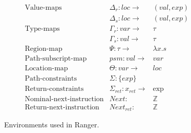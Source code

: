 \begin{figure}
$$
\begin{array}{lllll}
\text{Value-maps} & \Delta_r: loc \rightarrow & ( val, exp) &&
\\
& \Delta_s: loc \rightarrow & (val, exp) &&
\\
\text{Type-maps}  & \Gamma_r: var \rightarrow & \tau & &
\\
& \Gamma_s: val \rightarrow & \tau&&
\\
\text{Region-map} & \Psi: \tau \rightarrow & \lambda x.s &&
\\
\text{Path-subscript-map} & psm: val \rightarrow & var &&
\\
\text{Location-map} & \Theta: var \rightarrow & loc &&
\\
\text{Path-constraints} & \Sigma: \{exp\} &  &  & 
\\
\text{Return-constraints} & \Sigma_{ret}: x_{ret} \rightarrow & \exp &  & 
\\
\text{Nominal-next-instruction} & Next: & \mathbb{Z} &  & 
\\
\text{Return-next-instruction} & Next_{ret}: & \mathbb{Z} &  & 
\end{array}
$$
\caption{Environments used in Ranger.}
\label{fig:environment}
\end{figure}

